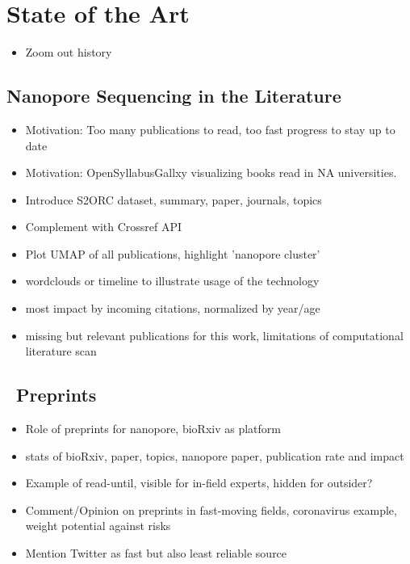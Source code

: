 \chapter{State of the Art}
\label{cha:state_of_art}

\begin{itemize}
    \item Zoom out history \cite{Deamer2016}
\end{itemize}




\section{Nanopore Sequencing in the Literature}
\label{sec:state_of_art:nanopore_literature}

\begin{itemize}
    \item Motivation: Too many publications to read, too fast progress to stay up to date
    \item Motivation: OpenSyllabusGallxy visualizing books read in NA universities.
    \item Introduce S2ORC dataset, summary, paper, journals, topics
    \item Complement with Crossref API
    \item Plot UMAP of all publications, highlight 'nanopore cluster'
    \item wordclouds or timeline to illustrate usage of the technology
    \item most impact by incoming citations, normalized by year/age
    \item missing but relevant publications for this work, limitations of computational literature scan
\end{itemize}




\section{\Biorxiv\ Preprints}
\label{sec:state_of_art:biorxiv}

\begin{itemize}
    \item Role of preprints for nanopore, bioRxiv as platform
    \item stats of bioRxiv, paper, topics, nanopore paper, publication rate and impact
    \item Example of read-until, visible for in-field experts, hidden for outsider?
    \item Comment/Opinion on preprints in fast-moving fields, coronavirus example, weight potential against risks
    \item Mention Twitter as fast but also least reliable source
\end{itemize}




